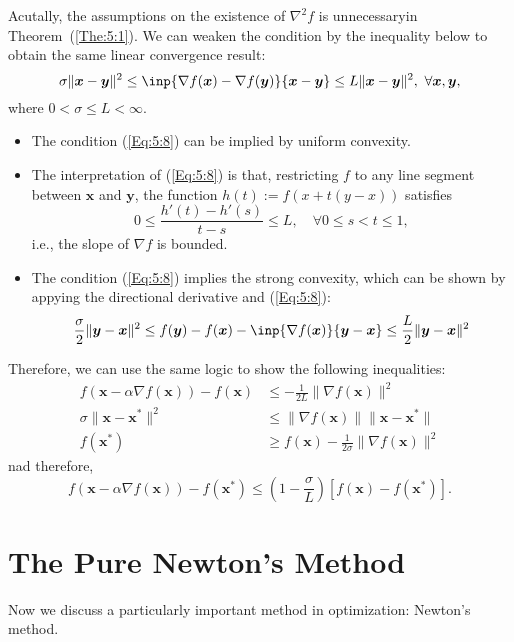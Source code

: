 Acutally, the assumptions on the existence of $\nabla^2f$ is unnecessaryin Theorem~(\ref{The:5:1}). We can weaken the condition by the inequality below to obtain the same linear convergence result:
\begin{equation}\label{Eq:5:8}
\sigma\|\bm x-\bm y\|^2\le \inp{\nabla f(\bm x)-\nabla f(\bm y)}{\bm x-\bm y}\le L\|\bm x-\bm y\|^2,\ \forall \bm x,\bm y,
\end{equation}
where $0<\sigma\le L<\infty$.
\begin{remark}
\begin{itemize}
\item
The condition (\ref{Eq:5:8}) can be implied by uniform convexity.
\item
The interpretation of (\ref{Eq:5:8}) is that, restricting $f$ to any line segment between $\bm x$ and $\bm y$, the function $h(t):=f(x + t(y-x))$ satisfies
\[
0\le \frac{h'(t) - h'(s)}{t-s}\le L,\quad\forall 0\le s<t\le1,
\]
i.e., the slope of $\nabla f$ is bounded.
\item
The condition (\ref{Eq:5:8}) implies the strong convexity, which can be shown by appying the directional derivative and (\ref{Eq:5:8}):
\[
\frac{\sigma}{2}\|\bm y-\bm x\|^2\le f(\bm y) - f(\bm x) - \inp{\nabla f(\bm x)}{\bm y-\bm x}\le\frac{L}{2}\|\bm y-\bm x\|^2
\]
\end{itemize}
\end{remark}
Therefore, we can use the same logic to show the following inequalities:
\begin{align*}
f(\bm x-\alpha\nabla f(\bm x)) - f(\bm x)&\le-\frac{1}{2L}\|\nabla f(\bm x)\|^2\\
\sigma\|\bm x-\bm x^*\|^2&\le\|\nabla f(\bm x)\|\|\bm x-\bm x^*\|\\
f(\bm x^*)&\ge f(\bm x) - \frac{1}{2\sigma}\|\nabla f(\bm x)\|^2
\end{align*}
nad therefore,
\[
f(\bm x-\alpha\nabla f(\bm x)) - f(\bm x^*)\le\left(1-\frac{\sigma}{L}\right)[f(\bm x) - f(\bm x^*)].
\]

\section{The Pure Newton's Method}
Now we discuss a particularly important method in optimization: Newton’s method.

